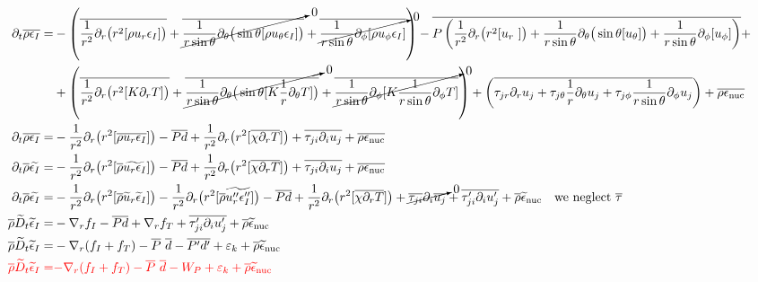 \documentclass[10pt,paper=a4]{report}
\newcommand{\eht}{\overline}
\newcommand{\fht}{\widetilde}
\begin{document}
\begin{align}
\partial_{t} \eht{\rho \epsilon_I}  = &  - \left( \eht{\frac{1}{r^{2}}\partial_{r}\big(r^{2}[\rho u_{r} \epsilon_I]\big)} + \cancelto{0}{\eht{\frac{1}{r\sin{\theta}}\partial_{\theta} \big(\sin{\theta} [\rho u_{\theta} \epsilon_I]\big)}} + \cancelto{0}{\eht{\frac{1}{r\sin{\theta}}\partial_{\phi} [\rho u_{\phi} \epsilon_I]}} \right) - \eht{P \left( \frac{1}{r^{2}}\partial_{r}\big(r^{2}[u_{r}~]\big) + \frac{1}{r\sin{\theta}}\partial_{\theta} \big(\sin{\theta} [u_{\theta}]\big) + \frac{1}{r\sin{\theta}}\partial_{\phi} [u_{\phi}]  \right)} + \nonumber \\
& + \left( \eht{\frac{1}{r^{2}}\partial_{r}\big(r^{2}[K\partial_r T]\big)} + \cancelto{0}{\eht{\frac{1}{r\sin{\theta}}\partial_{\theta} \big(\sin{\theta} [K\frac{1}{r}\partial_\theta T]\big)}} + \cancelto{0}{\eht{\frac{1}{r\sin{\theta}}\partial_{\phi} [K\frac{1}{r\sin{\theta}}\partial_\phi T]}} \right) + \left( \eht{\tau_{jr} \partial_r u_j + \tau_{j\theta} \frac{1}{r}\partial_\theta u_j + \tau_{j\phi} \frac{1}{r\sin{\theta}}\partial_\phi u_j}  \right) + \eht{\rho \epsilon_{\rm nuc}} \\
\partial_{t} \eht{\rho \epsilon_I}  = &  - \frac{1}{r^{2}}\partial_{r}\big(r^{2}[\eht{\rho u_{r} \epsilon_I}]\big) - \eht{P d} + \frac{1}{r^{2}}\partial_{r}\big(r^{2}[\eht{\chi \partial_r T}]\big) + \eht{\tau_{ji} \partial_i u_j} + \eht{\rho \epsilon_{\rm nuc}} \\
\partial_{t} \eht{\rho} \fht{\epsilon_I}  = &  - \frac{1}{r^{2}}\partial_{r}\big(r^{2}[\eht{\rho} \fht{u_{r} \epsilon_I}]\big) - \eht{P d} + \frac{1}{r^{2}}\partial_{r}\big(r^{2}[\eht{\chi \partial_r T}]\big) + \eht{\tau_{ji} \partial_i u_j} + \eht{\rho \epsilon_{\rm nuc}} \\
\partial_{t} \eht{\rho} \fht{\epsilon_I}  = &  - \frac{1}{r^{2}}\partial_{r}\big(r^{2}[\eht{\rho} \fht{u}_{r} \fht{\epsilon}_I]\big) -\frac{1}{r^{2}}\partial_{r}\big(r^{2}[\eht{\rho} \fht{u''_{r} \epsilon''_I}]\big)  - \eht{P d} + \frac{1}{r^{2}}\partial_{r}\big(r^{2}[\eht{\chi \partial_r T}]\big) + \cancelto{0}{\eht{\tau_{ji}} \partial_i \eht{u_j}} + \eht{\tau'_{ji}\partial_i u'_j} + \eht{\rho} \fht{\epsilon}_{\rm nuc} \ \ \ \mbox{we neglect $\eht{\tau}$} \\
\eht{\rho}\fht{D}_t \fht{\epsilon}_I = & -\nabla_r f_I - \eht{P d} + \nabla_r f_T + \eht{\tau'_{ji}\partial_i u'_j} + \eht{\rho} \fht{\epsilon}_{\rm nuc} \\
\eht{\rho}\fht{D}_t \fht{\epsilon}_I = & -\nabla_r (f_I + f_T) - \eht{P} \ \eht{d} - \eht{P'd'} + \varepsilon_k + \eht{\rho} \fht{\epsilon}_{\rm nuc} \\
{\color{red} \eht{\rho}\fht{D}_t \fht{\epsilon}_I =} & {\color{red}-\nabla_r (f_I + f_T) - \eht{P} \ \eht{d} - W_P + \varepsilon_k + \eht{\rho} \fht{\epsilon}_{\rm nuc}}
\end{align}
\end{document}
